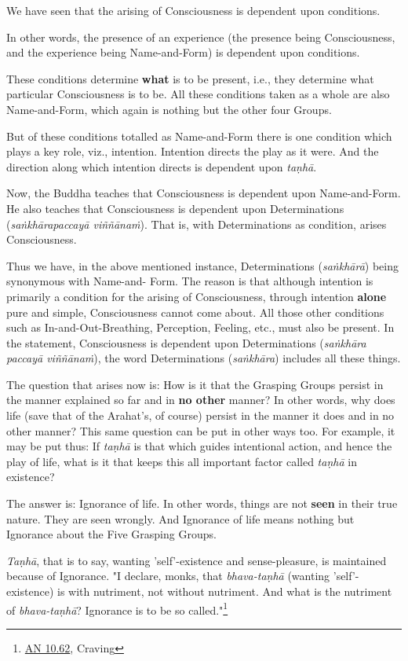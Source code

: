 We have seen that the arising of Consciousness is dependent upon conditions.

In other words, the presence of an experience (the presence being Consciousness, and the experience being Name-and-Form) is dependent upon conditions.

These conditions determine \textbf{what} is to be present, i.e., they determine what particular Consciousness is to be. All these conditions taken as a whole are also Name-and-Form, which again is nothing but the other four Groups.

But of these conditions totalled as Name-and-Form there is one condition which plays a key role, viz., intention. Intention directs the play as it were. And the direction along which intention directs is dependent upon \emph{taṇhā}.

Now, the Buddha teaches that Consciousness is dependent upon Name-and-Form. He also teaches that Consciousness is dependent upon Determinations (\emph{saṅkhārapaccayā viññānaṁ}). That is, with Determinations as condition, arises Consciousness.

Thus we have, in the above mentioned instance, Determinations (\emph{saṅkhārā}) being synonymous with Name-and- Form. The reason is that although intention is primarily a condition for the arising of Consciousness, through intention \textbf{alone} pure and simple, Consciousness cannot come about. All those other conditions such as In-and-Out-Breathing, Perception, Feeling, etc., must also be present. In the statement, Consciousness is dependent upon Determinations (\emph{saṅkhāra paccayā viññānaṁ}), the word Determinations (\emph{saṅkhāra}) includes all these things.

The question that arises now is: How is it that the Grasping Groups persist in the manner explained so far and in \textbf{no other} manner? In other words, why does life (save that of the Arahat's, of course) persist in the manner it does and in no other manner? This same question can be put in other ways too. For example, it may be put thus: If \emph{taṇhā} is that which guides intentional action, and hence the play of life, what is it that keeps this all important factor called \emph{taṇhā} in existence?

The answer is: Ignorance of life. In other words, things are not \textbf{seen} in their true nature. They are seen wrongly. And Ignorance of life means nothing but Ignorance about the Five Grasping Groups.

\emph{Taṇhā}, that is to say, wanting 'self'-existence and sense-pleasure, is maintained because of Ignorance. "I declare, monks, that \emph{bhava-taṇhā} (wanting 'self'-existence) is with nutriment, not without nutriment. And what is the nutriment of \emph{bhava-taṇhā}? Ignorance is to be so called."\footnote{\href{https://suttacentral.net/an10.62/en/bodhi}{AN 10.62}, Craving}

